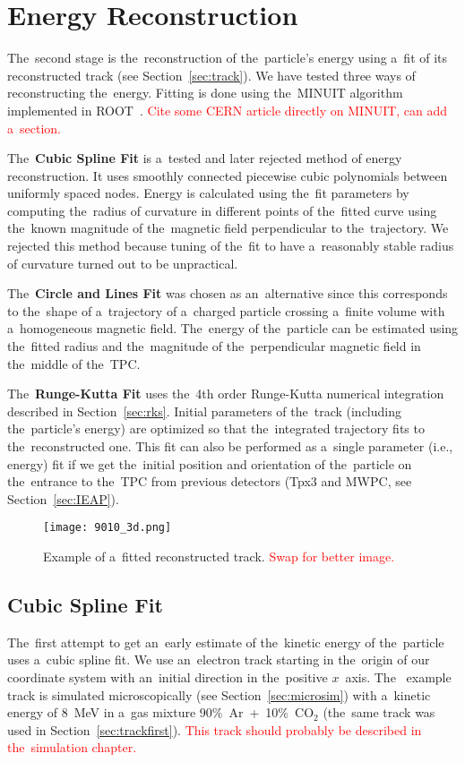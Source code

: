 \chapter{Energy Reconstruction}
\label{sec:energy}
	The~second stage is the~reconstruction of the~particle's energy using a~fit of its reconstructed track (see Section~\ref{sec:track}). We have tested three ways of reconstructing the~energy. Fitting is done using the~MINUIT algorithm implemented in ROOT~\cite{ROOT}. \textcolor{red}{Cite some CERN article directly on MINUIT, can add a~section.}
	
	The~\textbf{Cubic Spline Fit} is a~tested and later rejected method of energy reconstruction. It uses smoothly connected piecewise cubic polynomials between uniformly spaced nodes. Energy is calculated using the~fit parameters by computing the~radius of curvature in different points of the~fitted curve using the~known magnitude of the~magnetic field perpendicular to the~trajectory. We rejected this method because tuning of the~fit to have a~reasonably stable radius of curvature turned out to be unpractical.
	
	The~\textbf{Circle and Lines Fit} was chosen as an~alternative since this corresponds to the~shape of a~trajectory of a~charged particle crossing a~finite volume with a~homogeneous magnetic field. The~energy of the~particle can be estimated using the~fitted radius and the~magnitude of the~perpendicular magnetic field in the~middle of the~\ac{TPC}.
	
	The~\textbf{Runge-Kutta Fit} uses the~4th order Runge-Kutta numerical integration described in Section~\ref{sec:rks}. Initial parameters of the~track (including the~particle's energy) are optimized so that the~integrated trajectory fits to the~reconstructed one. This fit can also be performed as a~single parameter (i.e., energy) fit if we get the~initial position and orientation of the~particle on the~entrance to the~\ac{TPC} from previous detectors (\ac{Tpx3} and \ac{MWPC}, see Section~\ref{sec:IEAP}).
	
	\begin{figure}
		\centering
		\texttt{[image: 9010\_3d.png]}
		\caption{Example of a~fitted reconstructed track. \textcolor{red}{Swap for better image.}}
		\label{fig:90103d}
	\end{figure}
	
	\section{Cubic Spline Fit}
	\label{sec:cspline}
		The~first attempt to get an~early estimate of the~kinetic energy of the~particle uses a~cubic spline fit. We use an~electron track starting in the~origin of our coordinate system with an~initial direction in the~positive $x$~axis. The~ example track is simulated microscopically (see Section~\ref{sec:microsim}) with a~kinetic energy of 8~MeV in a~gas mixture 90\%~Ar~+~10\%~CO$_2$ (the~same track was used in Section~\ref{sec:trackfirst}). \textcolor{red}{This track should probably be described in the~simulation chapter.}
				
